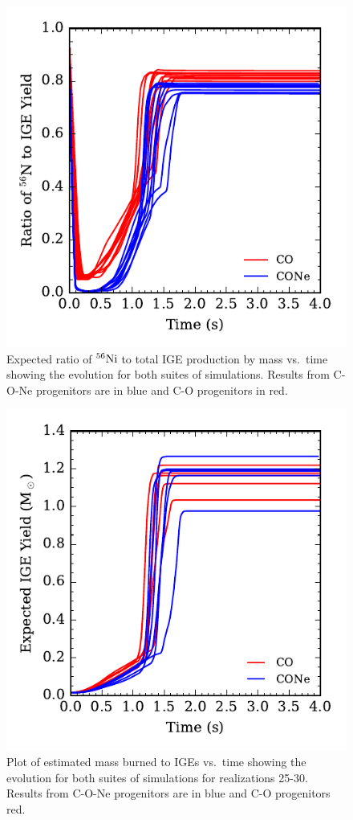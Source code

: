 \documentclass[preprint2]{aastex63}
\newcommand{\Ni}[1]{\ensuremath{{}^{#1}{\rm Ni}}}
\begin{document}
\begin{figure}
\includegraphics[width=\columnwidth]{figures/RatioNi56IGE_v_time_plot.pdf}
\caption{\label{fig:compare_ratio}
Expected ratio of \Ni{56} to total IGE production by mass vs.\ time showing the evolution
for both suites of simulations. Results from C-O-Ne progenitors are in blue and C-O progenitors in red.
}
\end{figure}
\begin{figure}
\includegraphics[width=\columnwidth]{figures/MBTI_v_time_plot.pdf}
\caption{\label{fig:compare_burned}
Plot of estimated mass burned to IGEs vs.\ time showing the evolution
for both suites of simulations for realizations 25-30. Results from C-O-Ne progenitors are
in blue and C-O progenitors red.
}
\end{figure}
\end{document}
